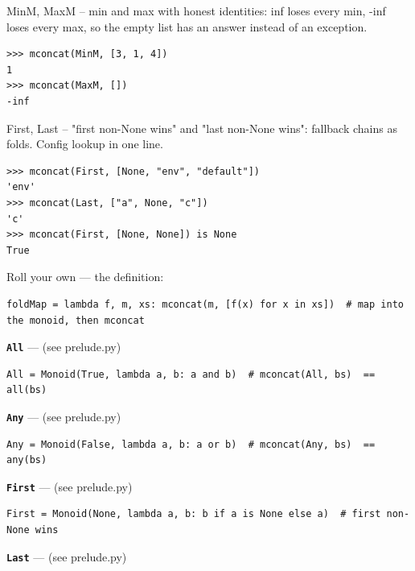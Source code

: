 \documentclass[10pt,letterpaper]{book}
\begin{document}
MinM, MaxM -- min and max with honest identities: inf loses every min, -inf loses every max, so the empty list has an answer instead of an exception.

\begin{lstlisting}[style=ex]
>>> mconcat(MinM, [3, 1, 4])
1
>>> mconcat(MaxM, [])
-inf
\end{lstlisting}

First, Last -- "first non-None wins" and "last non-None wins": fallback chains as folds. Config lookup in one line.

\begin{lstlisting}[style=ex]
>>> mconcat(First, [None, "env", "default"])
'env'
>>> mconcat(Last, ["a", None, "c"])
'c'
>>> mconcat(First, [None, None]) is None
True
\end{lstlisting}

Roll your own --- the definition:

\begin{lstlisting}[style=ex]
foldMap = lambda f, m, xs: mconcat(m, [f(x) for x in xs])  # map into the monoid, then mconcat
\end{lstlisting}

\textbf{\texttt{All}}\label{def:All} --- (see prelude.py)

\begin{lstlisting}[style=ex]
All = Monoid(True, lambda a, b: a and b)  # mconcat(All, bs)  == all(bs)
\end{lstlisting}
\textbf{\texttt{Any}}\label{def:Any} --- (see prelude.py)

\begin{lstlisting}[style=ex]
Any = Monoid(False, lambda a, b: a or b)  # mconcat(Any, bs)  == any(bs)
\end{lstlisting}
\textbf{\texttt{First}}\label{def:First} --- (see prelude.py)

\begin{lstlisting}[style=ex]
First = Monoid(None, lambda a, b: b if a is None else a)  # first non-None wins
\end{lstlisting}
\textbf{\texttt{Last}}\label{def:Last} --- (see prelude.py)
\end{document}
